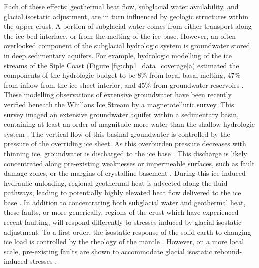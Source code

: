 Each of these effects; geothermal heat flow, subglacial water availability, and glacial isostatic adjustment, are in turn influenced by geologic structures within the upper crust. A portion of subglacial water comes from either transport along the ice-bed interface, or from the melting of the ice base. However, an often overlooked component of the subglacial hydrologic system is groundwater stored in deep sedimentary aquifers. For example, hydrologic modelling of the ice streams of the Siple Coast (Figure \ref{fig:chp1_data_coverage}a) estimated the components of the hydrologic budget to be 8\% from local basal melting, 47\% from inflow from the ice sheet interior, and 45\% from groundwater reservoirs \citep{christoffersensignificant2014}. These modelling observations of extensive groundwater have been recently verified beneath the Whillans Ice Stream by a magnetotelluric survey. This survey imaged an extensive groundwater aquifer within a sedimentary basin, containing at least an order of magnitude more water than the shallow hydrologic system \citep{gustafsondynamic2022}. The vertical flow of this basinal groundwater is controlled by the pressure of the overriding ice sheet. As this overburden pressure decreases with thinning ice, groundwater is discharged to the ice base \citep{goochpotential2016, lisedimentary2022}. This discharge is likely concentrated along pre-existing weaknesses or impermeable surfaces, such as fault damage zones, or the margins of crystalline basement \citep{joliegeological2021}. During this ice-induced hydraulic unloading, regional geothermal heat is advected along the fluid pathways, leading to potentially highly elevated heat flow delivered to the ice base \citep{ravierglaciohydrogeology2018, lisedimentary2022}. In addition to concentrating both subglacial water and geothermal heat, these faults, or more generically, regions of the crust which have experienced recent faulting, will respond differently to stresses induced by glacial isostatic adjustment. To a first order, the isostatic response of the solid-earth to changing ice load is controlled by the rheology of the mantle \citep{whitehousesolid2019}. However, on a more local scale, pre-existing faults are shown to accommodate glacial isostatic rebound-induced stresses \citep{peltierglacial2022, steffenglacially2021}. \\

